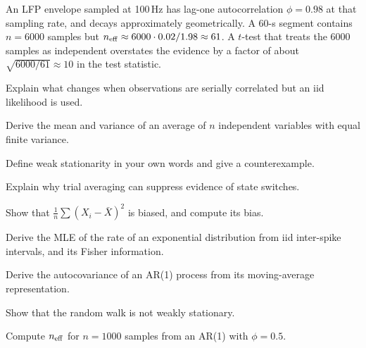 \begin{workedexample}
An LFP envelope sampled at 100\,Hz has lag-one autocorrelation $\phi=0.98$ at that sampling rate, and decays approximately geometrically. A 60-s segment contains $n=6000$ samples but $n_{\rm eff}\approx6000\cdot0.02/1.98\approx61$. A $t$-test that treats the 6000 samples as independent overstates the evidence by a factor of about $\sqrt{6000/61}\approx10$ in the test statistic.
\end{workedexample}
\begin{exercises}
\item Explain what changes when observations are serially correlated but an iid likelihood is used.
\item Derive the mean and variance of an average of $n$ independent variables with equal finite variance.
\item Define weak stationarity in your own words and give a counterexample.
\item Explain why trial averaging can suppress evidence of state switches.
\item Show that $\frac1n\sum(X_i-\bar X)^2$ is biased, and compute its bias.
\item Derive the MLE of the rate of an exponential distribution from iid inter-spike intervals, and its Fisher information.
\item Derive the autocovariance of an AR(1) process from its moving-average representation.
\item Show that the random walk is not weakly stationary.
\item Compute $n_{\rm eff}$ for $n=1000$ samples from an AR(1) with $\phi=0.5$.
\end{exercises}
